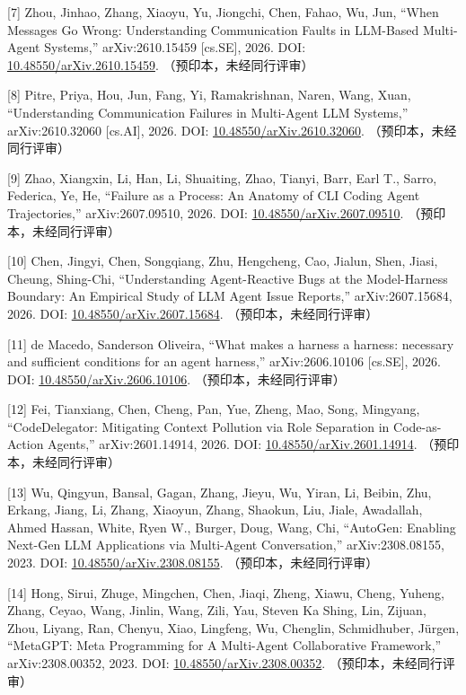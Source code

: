 \documentclass[
]{article}
\begin{document}
{[}7{]} Zhou, Jinhao, Zhang, Xiaoyu, Yu, Jiongchi, Chen, Fahao, Wu, Jun,
``When Messages Go Wrong: Understanding Communication Faults in
LLM-Based Multi-Agent Systems,'' arXiv:2610.15459 {[}cs.SE{]}, 2026.
DOI:
\href{https://doi.org/10.48550/arXiv.2610.15459}{10.48550/arXiv.2610.15459}.
（预印本，未经同行评审）

{[}8{]} Pitre, Priya, Hou, Jun, Fang, Yi, Ramakrishnan, Naren, Wang,
Xuan, ``Understanding Communication Failures in Multi-Agent LLM
Systems,'' arXiv:2610.32060 {[}cs.AI{]}, 2026. DOI:
\href{https://doi.org/10.48550/arXiv.2610.32060}{10.48550/arXiv.2610.32060}.
（预印本，未经同行评审）

{[}9{]} Zhao, Xiangxin, Li, Han, Li, Shuaiting, Zhao, Tianyi, Barr, Earl
T., Sarro, Federica, Ye, He, ``Failure as a Process: An Anatomy of CLI
Coding Agent Trajectories,'' arXiv:2607.09510, 2026. DOI:
\href{https://doi.org/10.48550/arXiv.2607.09510}{10.48550/arXiv.2607.09510}.
（预印本，未经同行评审）

{[}10{]} Chen, Jingyi, Chen, Songqiang, Zhu, Hengcheng, Cao, Jialun,
Shen, Jiasi, Cheung, Shing-Chi, ``Understanding Agent-Reactive Bugs at
the Model-Harness Boundary: An Empirical Study of LLM Agent Issue
Reports,'' arXiv:2607.15684, 2026. DOI:
\href{https://doi.org/10.48550/arXiv.2607.15684}{10.48550/arXiv.2607.15684}.
（预印本，未经同行评审）

{[}11{]} de Macedo, Sanderson Oliveira, ``What makes a harness a
harness: necessary and sufficient conditions for an agent harness,''
arXiv:2606.10106 {[}cs.SE{]}, 2026. DOI:
\href{https://doi.org/10.48550/arXiv.2606.10106}{10.48550/arXiv.2606.10106}.
（预印本，未经同行评审）

{[}12{]} Fei, Tianxiang, Chen, Cheng, Pan, Yue, Zheng, Mao, Song,
Mingyang, ``CodeDelegator: Mitigating Context Pollution via Role
Separation in Code-as-Action Agents,'' arXiv:2601.14914, 2026. DOI:
\href{https://doi.org/10.48550/arXiv.2601.14914}{10.48550/arXiv.2601.14914}.
（预印本，未经同行评审）

{[}13{]} Wu, Qingyun, Bansal, Gagan, Zhang, Jieyu, Wu, Yiran, Li,
Beibin, Zhu, Erkang, Jiang, Li, Zhang, Xiaoyun, Zhang, Shaokun, Liu,
Jiale, Awadallah, Ahmed Hassan, White, Ryen W., Burger, Doug, Wang, Chi,
``AutoGen: Enabling Next-Gen LLM Applications via Multi-Agent
Conversation,'' arXiv:2308.08155, 2023. DOI:
\href{https://doi.org/10.48550/arXiv.2308.08155}{10.48550/arXiv.2308.08155}.
（预印本，未经同行评审）

{[}14{]} Hong, Sirui, Zhuge, Mingchen, Chen, Jiaqi, Zheng, Xiawu, Cheng,
Yuheng, Zhang, Ceyao, Wang, Jinlin, Wang, Zili, Yau, Steven Ka Shing,
Lin, Zijuan, Zhou, Liyang, Ran, Chenyu, Xiao, Lingfeng, Wu, Chenglin,
Schmidhuber, Jürgen, ``MetaGPT: Meta Programming for A Multi-Agent
Collaborative Framework,'' arXiv:2308.00352, 2023. DOI:
\href{https://doi.org/10.48550/arXiv.2308.00352}{10.48550/arXiv.2308.00352}.
（预印本，未经同行评审）
\end{document}
